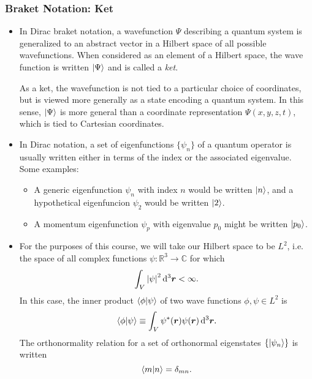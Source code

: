 \documentclass[11pt, a4paper]{article}
\newcommand{\diff}{\mathop{}\!\mathrm{d}} %
\newcommand{\dr}{\diff^{3} \r}  %
\renewcommand{\vec}[1]{\bm{#1}}  %
\renewcommand{\r}{\vec{r}}  %
\begin{document}
\subsubsection{Braket Notation: Ket}

\begin{itemize}
    \item In Dirac braket notation, a wavefunction $ \Psi $ describing a quantum system is generalized to an abstract vector in a Hilbert space of all possible wavefunctions. When considered as an element of a Hilbert space, the wave function is written $ \ket{\Psi} $ and is called a \textit{ket}. 

    As a ket, the wavefunction is not tied to a particular choice of coordinates, but is viewed more generally as a state encoding a quantum system. In this sense, $ \ket{\Psi} $ is more general than a coordinate representation $ \Psi(x, y, z, t) $, which is tied to Cartesian coordinates. 

    \item In Dirac notation, a set of eigenfunctions $ \{\psi_{n}\} $ of a quantum operator is usually written either in terms of the index or the associated eigenvalue. Some examples:
    \begin{itemize}
        \item A generic eigenfunction $ \psi_{n} $ with index $ n $ would be written $ \ket{n} $, and a hypothetical eigenfuncion $ \psi_{2} $ would be written $ \ket{2} $.

        \item A momentum eigenfunction $ \psi_{p} $ with eigenvalue $ p_{0} $ might be written $ \ket{p_{0}} $.

    \end{itemize}

	\item For the purposes of this course, we will take our Hilbert space to be $ L^{2} $, i.e. the space of all complex functions $ \psi : \mathbb{R}^{3} \to \mathbb{C} $ for which
    \begin{equation*}
        \int_{V} \abs{\psi}^{2} \dr < \infty.
    \end{equation*}
    In this case, the inner product $ \braket{\phi}{\psi} $ of two wave functions $ \phi, \psi \in L^{2} $ is 
	\begin{equation*}
		\braket{\phi}{\psi} \equiv \int_{V}\psi^{*}(\r)\psi(\r)\dr.
	\end{equation*}
    The orthonormality relation for a set of orthonormal eigenstates $ \{\ket{\psi_{n}}\} $ is written
    \begin{equation*}
        \braket{m}{n} = \delta_{mn}.
    \end{equation*}


\end{itemize}
\end{document}
